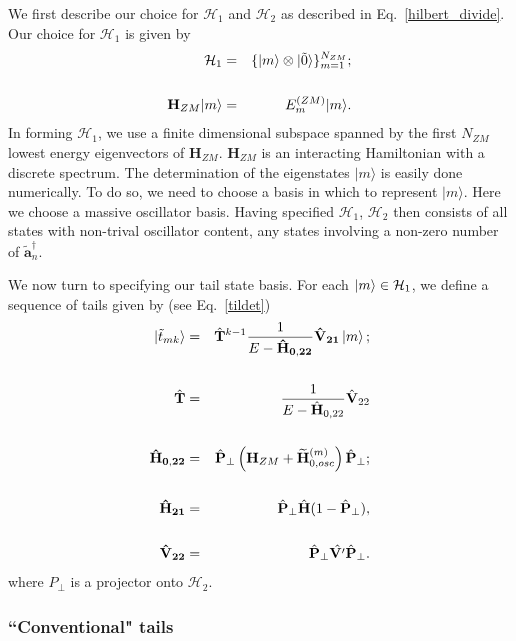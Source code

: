 \documentclass[twocolumn,secnumarabic,amssymb, nobibnotes, aps, prd]{revtex4-2}
\newcommand{\Ht}{{\hat {\bf T}}}
\newcommand{\Vhh}{\hat{\bf V}_{22}}
\begin{document}
We first describe our choice for $\mathcal{H}_1$ and $\mathcal{H}_2$ as described in Eq.~\eqref{hilbert_divide}.  Our choice for $\mathcal{H}_1$ is given by
\begin{eqnarray}
\mathcal{H}_1 &=& \{\ket{m}\otimes\ket{\tilde{0}}\}^{N_{ZM}}_{m=1};\cr\cr
\mathbf{H}_{ZM}|m\rangle &=& E_m^{(ZM)}|m\rangle. \label{ZMEVprob}
\end{eqnarray}
In forming $\mathcal{H}_1$, we use a finite dimensional subspace spanned by the first $N_{ZM}$ lowest energy eigenvectors of 
$\mathbf{H}_{ZM}$. $\mathbf{H}_{ZM}$ is an interacting Hamiltonian with a discrete spectrum. The determination of the eigenstates $|m\rangle$ is easily done numerically. To do so, we need to choose a basis in which to represent $|m\rangle$.  Here we choose a massive oscillator basis. Having specified $\mathcal{H}_1$, $\mathcal{H}_2$ then consists of all states with non-trival oscillator content, any states involving a non-zero number of $\widetilde{\mathbf{a}}^\dagger_n$.

We now turn to specifying our tail state basis.  For each $\ket{m}\in \mathcal{H}_1$, we define a sequence of tails given by (see Eq.~\ref{tildet})
\begin{eqnarray}
      \ket{\tilde t_{mk}} &=& \Ht^{k-1}\frac{1}{E-{\bf\hat H_{0,22}}}{\bf\hat V_{21}}\ket{m};\label{OrigTailBasis}\cr\cr
      \hat{\mathbf{T}} &=& \frac{1}{E-\hat {\bf H}_{0,22}}\Vhh \cr\cr
      {\bf\hat H_{0,22}} &=& \hat{\mathbf{P}}_{\perp}\left(\mathbf H_{ZM}+ \widetilde{\mathbf{H}}_{0,osc}^{(m)}\right)\hat{\mathbf{P}}_{\perp} ;\cr\cr
      {\bf\hat H_{21}} &=& \hat{\mathbf{P}}_{\perp}\hat{\mathbf H} (1-\hat{\mathbf{P}}_\perp),\cr\cr
      {\bf\hat V_{22}} &=& \hat{\mathbf{P}}_{\perp}\hat{\mathbf{V'}}\hat{\mathbf{P}}_{\perp}.
\end{eqnarray}
where $P_\perp$ is a projector onto $\mathcal{H}_2$.

\subsubsection{``Conventional" tails}
\end{document}
